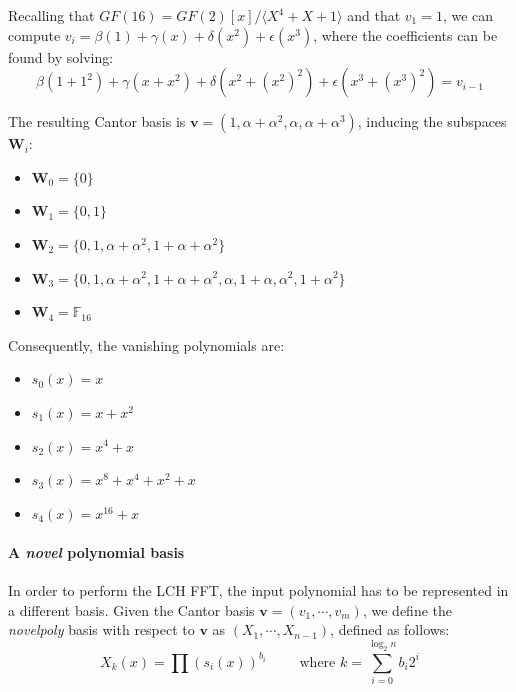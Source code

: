     \begin{example}
        Recalling that $GF(16) = GF(2)[x]/\langle X^4+X+1 \rangle$ and that $v_1 = 1$, we can compute $v_i = \beta(1) + \gamma(x) + \delta(x^2) + \epsilon(x^3)$,
        where the coefficients can be found by solving:
        \begin{equation*}
            \beta(1+1^2)+\gamma(x+x^2) + \delta(x^2+(x^2)^2) + \epsilon(x^3+(x^3)^2) = v_{i-1}
        \end{equation*}
        
        The resulting Cantor basis is $\mathbf{v} = (1, \alpha+\alpha^2, \alpha, \alpha+\alpha^3)$, inducing the subspaces $\mathbf{W}_i$:
        \begin{itemize}
            \item $\mathbf{W}_0 = \{0\}$
            \item $\mathbf{W}_1 = \{0, 1\}$
            \item $\mathbf{W}_2 = \{0, 1, \alpha+\alpha^2, 1+\alpha+\alpha^2\}$
            \item $\mathbf{W}_3 = \{0, 1, \alpha+\alpha^2, 1+\alpha+\alpha^2, \alpha, 1+\alpha, \alpha^2, 1+\alpha^2\}$
            \item $\mathbf{W}_4 = \mathds{F}_{16}$
        \end{itemize}
    Consequently, the vanishing polynomials are:
    \begin{itemize}
        \item $s_0(x) = x$
        \item $s_1(x) = x+x^2$
        \item $s_2(x) = x^4+x$
        \item $s_3(x) = x^8+x^4+x^2+x$
        \item $s_4(x) = x^{16}+x$
    \end{itemize}
    \end{example}

    \paragraph{A \textit{novel} polynomial basis}
    In order to perform the LCH FFT, the input polynomial has to be represented in a different basis. Given the Cantor basis $\mathbf{v} = (v_1, \cdots, v_m)$, we define the 
    \emph{novelpoly} basis with respect to $\mathbf{v}$ as $(X_1, \cdots, X_{n-1})$, defined as follows:
    \begin{equation}
        X_k(x) = \prod(s_i(x))^{b_i} \qquad \text{ where } k = \sum_{i=0}^{\log_2 n} b_i 2^i
    \end{equation}

